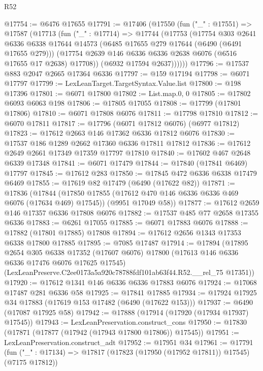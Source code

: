 \begin{lexlean}{R52}
\begin{coremodule}
@17754 := @6476 @17655
@17791 := @17406
    (@17550
      (fun ("_" : @17551) =>
      @17587
        (@17713
          (fun ("_" : @17714) =>
          @17744
            (@17753
              (@17754
                @303
                @2641
                @6336
                @6338
                @17644
                @14573
                (@6485 @17655 @279 @17644 (@6490 (@6491 @17655 @279)))
                (@17754 @2639 @146 @6336 @6336 @2638 @6076 (@6516 @17655 @17 @2638) @17708))
              (@6932 @17594 @2637))))))
@17796 := @17537 @883 @2047 @2665 @17364 @6336
@17797 := @159 @17194
@17798 := @6071 @17797
@17799 := LexLeanTarget.TargetSyntax.Value.list
@17800 := @198 @17396
@17801 := @6071 @17800
@17802 := List.map.{0, 0}
@17805 := @17802 @6093 @6063 @198
@17806 := @17805 @17055
@17808 := @17799 (@17801 @17806)
@17810 := @6071 @17808 @6076
@17811 := @17798 @17810
@17812 := @6070 @17811
@17817 := @17796 (@6071 @17812 @6076) (@6977 @17812)
@17823 := @17612 @2663 @146 @17362 @6336 @17812 @6076
@17830 := @17537 @186 @1289 @2662 @17360 @6336 @17811 @17812
@17836 := @17612 @2649 @2661 @17349 @17359 @17797 @17810
@17840 := @17602 @467 @2648 @6339 @17348
@17841 := @6071 @17479
@17844 := @17840 (@17841 @6469) @17797
@17845 := @17612 @283
@17850 := @17845 @472 @6336 @6338 @17479 @6469
@17855 := @17619 @82 @17479 (@6490 (@17622 @82))
@17871 := @17836
    (@17844
      (@17850 @17855 (@17612 @470 @146 @6336 @6336 @469 @6076 (@17634 @469) @17545))
      (@9951 @17049 @58))
@17877 := @17612 @2659 @146 @17357 @6336 @17808 @6076
@17882 := @17537 @485 @77 @2658 @17355 @6336
@17883 := @6261 @17055
@17885 := @6071 @17883 @6076
@17888 := @17882 (@17801 @17885) @17808
@17894 := @17612 @2656 @1343 @17353 @6338 @17800 @17885
@17895 := @7085 @17487
@17914 := @17894
    (@17895
      @2654
      @305
      @6338
      @17352
      (@17607 @6076)
      @17800
      (@17613 @146 @6336 @6336 @17476 @6076 @17625 @17545)
      (LexLeanPreserve.C2ee0173a5a920c78788fdf101ab63f44.R52.__rel_75 @17351))
@17920 := @17612 @1341 @146 @6336 @6336 @17883 @6076
@17924 := @17068 @17487 @281 @6336 @58
@17925 := @17841 @17885
@17934 := @17924 @17925 @34 @17883 (@17619 @153 @17482 (@6490 (@17622 @153)))
@17937 := @6490 (@17087 @17925 @58)
@17942 := @17888 (@17914 (@17920 (@17934 @17937) @17545))
@17943 := LexLeanPreservation.construct_cons
@17950 := @17830 (@17871 (@17877 (@17942 (@17943 @17800 @17806)) @17545))
@17951 := LexLeanPreservation.construct_adt
@17952 := @17951 @34
@17961 := @17791
    (fun ("_" : @17134) => @17817 (@17823 (@17950 (@17952 @17811)) @17545) (@7175 @17812))

\end{coremodule}
\end{lexlean}
